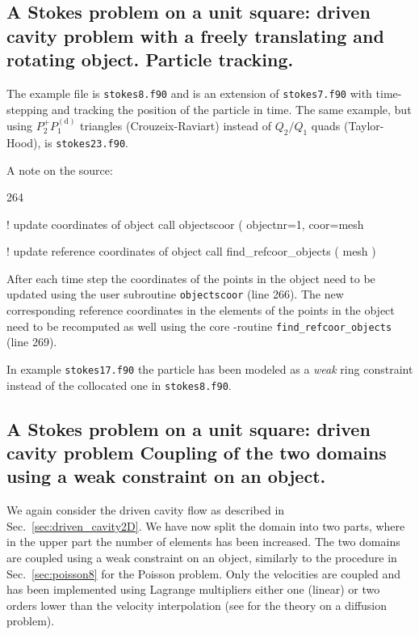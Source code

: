 \subsection{A Stokes problem on a unit square: driven cavity problem
 with a freely translating and rotating object. Particle tracking.}
\label{sec:drivenparticle}
                                                                                
The example file is \texttt{stokes8.f90} and is an extension of
\texttt{stokes7.f90} with time-stepping and tracking the position of the
particle in time. The same example, but using $P_2^+P_1^{(\text{d})}$ triangles (Crouzeix-Raviart) instead
of $Q_2/Q_1$ quads (Taylor-Hood), is \texttt{stokes23.f90}.

A note on the source:
\begin{listing}{264}

!     update coordinates of object
      call objectscoor ( objectnr=1, coor=mesh%

!     update reference coordinates of object
      call find_refcoor_objects ( mesh )

\end{listing}
After each time step the coordinates of the points in 
the object need to be updated using the
user subroutine \texttt{objectscoor} (line 266). The new corresponding reference
coordinates in the elements of the points in the object need to be recomputed
as well using the core \tfem-routine \texttt{find\_refcoor\_objects} (line 269).

In example \texttt{stokes17.f90} the particle has been modeled as a
\emph{weak} ring constraint instead of the collocated one in
\texttt{stokes8.f90}.

\subsection{A Stokes problem on a unit square: driven cavity problem
            Coupling of the two domains using a weak
            constraint on an object.}
\label{sec:stokes19}

We again consider the driven cavity flow as described in 
Sec.~\ref{sec:driven_cavity2D}. We have now split the domain into two parts,
where in the upper part the number of elements has been increased. The two
domains are coupled using a weak constraint on an object, similarly to the
procedure in Sec.~\ref{sec:poisson8} for the Poisson problem. Only the
velocities are 
coupled and has been implemented using Lagrange multipliers either one
(linear) or two orders lower
than the velocity interpolation
(see \cite{SeSu00} for the theory on a diffusion problem).

